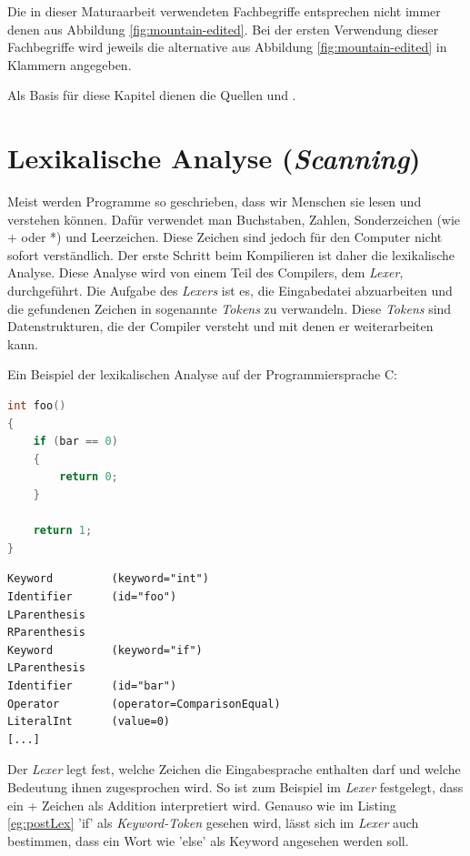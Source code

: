 Die in dieser Maturaarbeit verwendeten Fachbegriffe entsprechen nicht immer denen aus Abbildung \ref{fig:mountain-edited}.
Bei der ersten Verwendung dieser Fachbegriffe wird jeweils die alternative aus Abbildung \ref{fig:mountain-edited} in Klammern angegeben.

Als Basis für diese Kapitel dienen die Quellen \cite{CompilersDragon} und \cite{Lecture}.

\section{Lexikalische Analyse (\textit{Scanning})}
Meist werden Programme so geschrieben, dass wir Menschen sie lesen und verstehen können. Dafür verwendet man Buchstaben, Zahlen, Sonderzeichen (wie + oder *) und Leerzeichen.
Diese Zeichen sind jedoch für den Computer nicht sofort verständlich. Der erste Schritt beim Kompilieren ist daher die lexikalische Analyse. Diese Analyse wird von einem Teil des Compilers, dem \textit{Lexer}, durchgeführt.
Die Aufgabe des \textit{Lexers} ist es, die Eingabedatei abzuarbeiten und die gefundenen Zeichen in sogenannte \textit{Tokens} zu verwandeln. Diese \textit{Tokens} sind Datenstrukturen, die der Compiler versteht und mit denen er weiterarbeiten kann.

Ein Beispiel der lexikalischen Analyse auf der Programmiersprache C:

\begin{lstlisting}[language=C, label=eg:preLex, caption=C code vor lexikalischer Analyse]
int foo()
{
    if (bar == 0)
    {
        return 0;
    }

    return 1;
}
\end{lstlisting}

\begin{lstlisting}[label=eg:postLex, caption=\textit{Tokens} nach lexikalischer Analyse]
Keyword         (keyword="int")
Identifier      (id="foo")
LParenthesis
RParenthesis
Keyword         (keyword="if")
LParenthesis
Identifier      (id="bar")
Operator        (operator=ComparisonEqual)
LiteralInt      (value=0)
[...]
\end{lstlisting}

Der \textit{Lexer} legt fest, welche Zeichen die Eingabesprache enthalten darf und welche Bedeutung ihnen zugesprochen wird. So ist zum Beispiel im \textit{Lexer} festgelegt, dass ein + Zeichen als Addition interpretiert wird.
Genauso wie im Listing \ref{eg:postLex} {\listingFont\selectfont 'if'} als \textit{Keyword-Token} gesehen wird, lässt sich im \textit{Lexer} auch bestimmen, dass ein Wort wie {\listingFont\selectfont 'else'} als Keyword angesehen werden soll.

